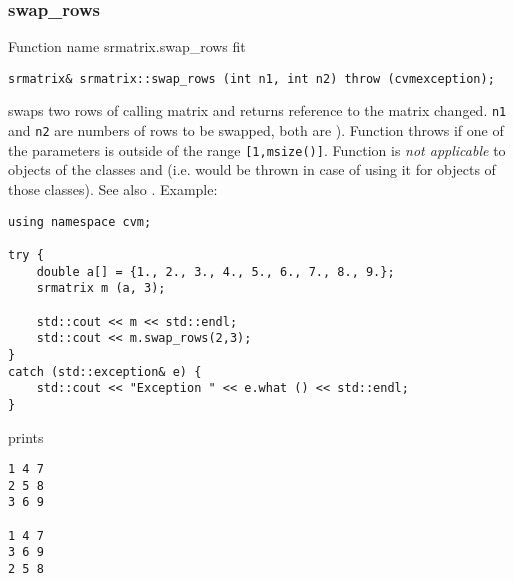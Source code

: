 \subsubsection{swap\_rows}
Function%
\pdfdest name {srmatrix.swap_rows} fit
\begin{verbatim}
srmatrix& srmatrix::swap_rows (int n1, int n2) throw (cvmexception);
\end{verbatim}
swaps two rows of  calling matrix and returns  reference to
the matrix changed. \verb"n1" and \verb"n2" are
numbers of rows to be swapped, 
both are \Based).
Function throws  
if one of the parameters is outside of the range
\verb"[1,msize()]".
Function is 
\emph{not applicable} to objects of the classes
 and
 (i.e.  would be thrown
in case of using it for objects of those classes).
See also .
Example:
\begin{Verbatim}
using namespace cvm;

try {
    double a[] = {1., 2., 3., 4., 5., 6., 7., 8., 9.};
    srmatrix m (a, 3);

    std::cout << m << std::endl;
    std::cout << m.swap_rows(2,3);
}
catch (std::exception& e) {
    std::cout << "Exception " << e.what () << std::endl;
}
\end{Verbatim}
prints
\begin{Verbatim}
1 4 7
2 5 8
3 6 9

1 4 7
3 6 9
2 5 8
\end{Verbatim}
\newpage



